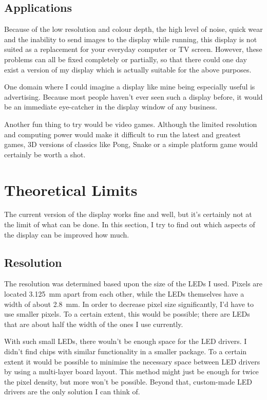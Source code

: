\documentclass[a4paper, 11pt, titlepage]{report}
\begin{document}
\subsection{Applications}

Because of the low resolution and colour depth, the high level of noise, quick wear and the
inability to send images to the display while running, this display is not suited as a replacement
for your everyday computer or TV screen. However, these problems can all be fixed completely or
partially, so that there could one day exist a version of my display which is actually suitable
for the above purposes.

One domain where I could imagine a display like mine being especially useful is advertising.
Because most people haven't ever seen such a display before, it would be an immediate eye-catcher
in the display window of any business.

Another fun thing to try would be video games. Although the limited resolution and computing power
would make it difficult to run the latest and greatest games, 3D versions of classics like Pong,
Snake or a simple platform game would certainly be worth a shot.


\section{Theoretical Limits}

The current version of the display works fine and well, but it's certainly not at the limit of
what can be done. In this section, I try to find out which aspects of the display can be improved
how much. 

\subsection{Resolution}

The resolution was determined based upon the size of the LEDs I used. Pixels are located
\SI{3.125}{\milli\meter} apart from each other, while the LEDs themselves have a width of about
\SI{2.8}{\milli\meter}. In order to decrease pixel size significantly, I'd have to use smaller
pixels. To a certain extent, this would be possible; there are LEDs that are about half the width
of the ones I use currently.

With such small LEDs, there wouln't be enough space for the LED drivers. I didn't find chips with
similar functionality in a smaller package. To a certain extent it would be possible to minimise
the necessary space between LED drivers by using a multi-layer board layout. This method might
just be enough for twice the pixel density, but more won't be possible. Beyond that, custom-made
LED drivers are the only solution I can think of.
\end{document}

